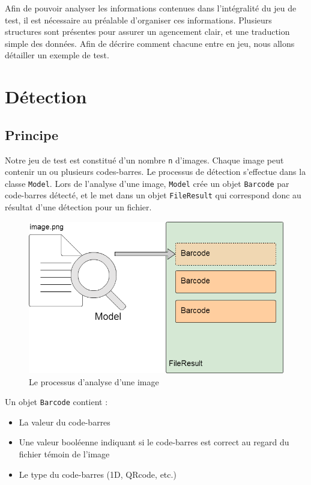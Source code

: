 Afin de pouvoir analyser les informations contenues dans l'intégralité du jeu de test, il est nécessaire au préalable d'organiser ces informations. Plusieurs structures sont présentes pour assurer un agencement clair, et une traduction simple des données. Afin de décrire comment chacune entre en jeu, nous allons détailler un exemple de test.

\section{Détection}

\subsection{Principe}

Notre jeu de test est constitué d'un nombre \verb|n| d'images. Chaque image peut contenir un ou plusieurs codes-barres. Le processus de détection s'effectue dans la classe \verb|Model|. Lors de l'analyse d'une image, \verb|Model| crée un objet \verb|Barcode| par code-barres détecté, et le met dans un objet \verb|FileResult| qui correspond donc au résultat d'une détection pour un fichier.

\begin{figure}
\begin{center}
\includegraphics[scale=0.3]{images/projet1Detection.png}
\caption{Le processus d'analyse d'une image}
\end{center}
\end{figure}

Un objet \verb|Barcode| contient :
\begin{itemize}
\item La valeur du code-barres
\item Une valeur booléenne indiquant si le code-barres est correct au regard du fichier témoin de l'image
\item Le type du code-barres (1D, QRcode, etc.)
\end{itemize}

